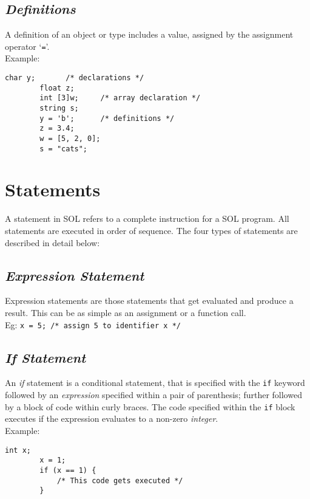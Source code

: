     \subsection{\textit{Definitions}}
    A definition of an object or type includes a value, assigned by the assignment operator `\texttt{=}'.\\
    Example:\\
    \begin{lstlisting}[style=sol]
        char y;       /* declarations */
        float z;
        int [3]w;     /* array declaration */
        string s;
        y = 'b';      /* definitions */
        z = 3.4;
        w = [5, 2, 0];
        s = "cats";
    \end{lstlisting}

\section{Statements} \label{classes}
A statement in SOL refers to a complete instruction for a SOL program. All statements are executed in order of sequence. The four types of statements are described in detail below:\\

    \subsection{\textit{Expression Statement}}
    Expression statements are those statements that get evaluated and produce a result. This can be as simple as an assignment or a function call.\\
    Eg: \texttt{x = 5; /* assign 5 to identifier x */}

    \subsection{\textit{If Statement}}
    An \textit{if} statement is a conditional statement, that is specified with the \texttt{if} keyword followed by an \textit{expression} specified within a pair of parenthesis; further followed by a block of code within curly braces. The code specified within the \texttt{if} block executes if the expression evaluates to a non-zero \textit{integer}.\\
    Example:\\
    \begin{lstlisting}[style=sol]
        int x;
        x = 1;
        if (x == 1) {
            /* This code gets executed */
        }
    \end{lstlisting}

